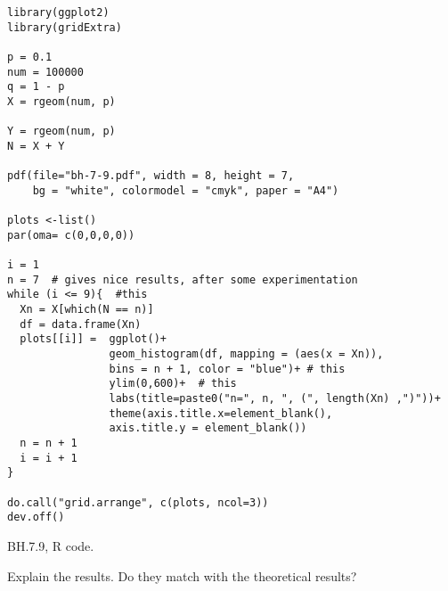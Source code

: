 \begin{listing}[!ht]
\begin{verbatim}
library(ggplot2)
library(gridExtra)

p = 0.1
num = 100000
q = 1 - p
X = rgeom(num, p)

Y = rgeom(num, p)
N = X + Y

pdf(file="bh-7-9.pdf", width = 8, height = 7,
    bg = "white", colormodel = "cmyk", paper = "A4")

plots <-list()
par(oma= c(0,0,0,0))

i = 1
n = 7  # gives nice results, after some experimentation
while (i <= 9){  #this
  Xn = X[which(N == n)]
  df = data.frame(Xn)
  plots[[i]] =  ggplot()+
                geom_histogram(df, mapping = (aes(x = Xn)),
                bins = n + 1, color = "blue")+ # this
                ylim(0,600)+  # this
                labs(title=paste0("n=", n, ", (", length(Xn) ,")"))+
                theme(axis.title.x=element_blank(),
                axis.title.y = element_blank())
  n = n + 1
  i = i + 1
}

do.call("grid.arrange", c(plots, ncol=3))
dev.off()
\end{verbatim}
\caption{BH.7.9, R code.}
\label{BH.7.9.r}

\end{listing}

\begin{exercise}
Explain the results. Do they match with the theoretical results?
\end{exercise}
